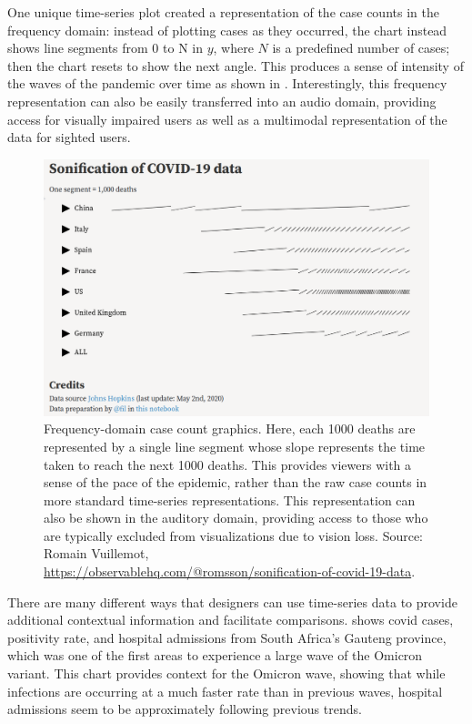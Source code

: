 \documentclass[article]{jdssv}\usepackage[]{graphicx}\usepackage[]{color}
\begin{document}
One unique time-series plot created a representation of the case counts in the frequency domain: instead of plotting cases as they occurred, the chart instead shows line segments from 0 to N in $y$, where $N$ is a predefined number of cases; then the chart resets to show the next angle. This produces a sense of intensity of the waves of the pandemic over time as shown in . Interestingly, this frequency representation can also be easily transferred into an audio domain, providing access for visually impaired users as well as a multimodal representation of the data for sighted users. 

\begin{figure}
\centering
\includegraphics[width=.75\linewidth]{frequency-domain}
\caption{Frequency-domain case count graphics. Here, each 1000 deaths are represented by a single line segment whose slope represents the time taken to reach the next 1000 deaths. This provides viewers with a sense of the pace of the epidemic, rather than the raw case counts in more standard time-series representations. This representation can also be shown in the auditory domain, providing access to those who are typically excluded from visualizations due to vision loss. Source: Romain Vuillemot, \url{https://observablehq.com/@romsson/sonification-of-covid-19-data}.}
\label{fig:freq-domain}
\end{figure}

There are many different ways that designers can use time-series data to provide additional contextual information and facilitate comparisons.  shows covid cases, positivity rate, and hospital admissions from South Africa's Gauteng province, which was one of the first areas to experience a large wave of the Omicron variant. This chart provides context for the Omicron wave, showing that while infections are occurring at a much faster rate than in previous waves, hospital admissions seem to be approximately following previous trends. 
\end{document}
